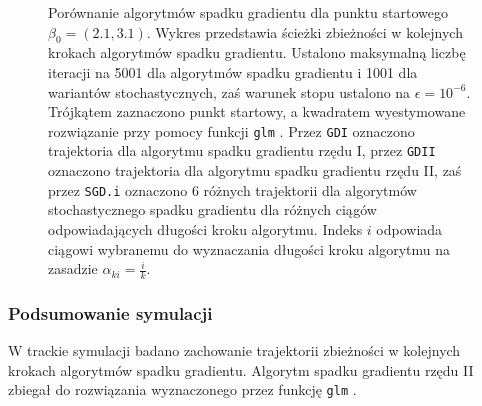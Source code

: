 \begin{figure}[hbt!]
  \caption[Porównanie algorytmów spadku gradientu dla punktu startowego $\beta_0 = (2.1,3.1)$.]{\label{fig:sc4asd}Porównanie algorytmów spadku gradientu dla punktu startowego $\beta_0 = (2.1,3.1)$. Wykres przedstawia ścieżki zbieżności w kolejnych krokach algorytmów spadku gradientu. Ustalono maksymalną liczbę iteracji na 5001 dla algorytmów spadku gradientu i 1001 dla wariantów stochastycznych, zaś warunek stopu ustalono na $\epsilon=10^{-6}$. Trójkątem zaznaczono punkt startowy, a kwadratem wyestymowane rozwiązanie przy pomocy funkcji \texttt{glm} \cite{glmglm}. Przez \texttt{GDI} oznaczono trajektoria dla algorytmu spadku gradientu rzędu I, przez \texttt{GDII} oznaczono trajektoria dla algorytmu spadku gradientu rzędu II, zaś przez \texttt{SGD.i} oznaczono 6 różnych trajektorii dla algorytmów stochastycznego spadku gradientu dla różnych ciągów odpowiadających długości kroku algorytmu. Indeks $i$ odpowiada ciągowi wybranemu do wyznaczania długości kroku algorytmu na zasadzie $\alpha_{ki} = \frac{i}{k}$.}
\end{figure}


\newpage

\subsubsection{Podsumowanie symulacji}
W trackie symulacji badano zachowanie trajektorii zbieżności w kolejnych krokach algorytmów spadku gradientu. Algorytm spadku gradientu rzędu II zbiegał do rozwiązania wyznaczonego przez funkcję \texttt{glm} \cite{glmglm}. 


